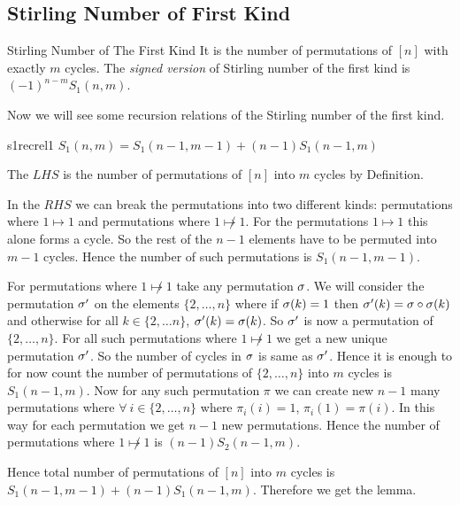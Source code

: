 \subsection{Stirling Number of First Kind}
\begin{Definition}{Stirling Number of The First Kind}{}
It is the number of permutations of $[n]$ with exactly $m$ cycles. The \textit{signed version} of Stirling number of the first kind is $(-1)^{n-m}S_1(n,m)$.
\end{Definition}
Now we will see some recursion relations of the Stirling number of the first kind. 
\begin{lemma}{}{s1recrel1}
	$S_1(n,m)=S_1(n-1,m-1)+(n-1)S_1(n-1,m)$
\end{lemma}
\begin{combi-proof}
	The $LHS$ is the number of permutations of $[n]$ into $m$ cycles by Definition. 
	
	In the $RHS$ we can break the permutations into two different kinds: permutations where $1\mapsto1$ and permutations where $1\not\mapsto 1$. For the permutations $1\mapsto1$ this alone forms a cycle. So the rest of the $n-1$ elements have to be permuted into $m-1$ cycles. Hence the number of such permutations is $S_1(n-1,m-1)$.
	
	For permutations where $1\not\mapsto 1$ take any permutation $\sigma$. We will consider the permutation $\sigma'$ on the elements $\{2,\dots, n\}$ where if $\sigma(k)=1$ then $\sigma'(k)=\sigma\circ\sigma(k)$ and otherwise for all $k\in \{2,\dots n\}$, $\sigma'(k)=\sigma(k)$. So $\sigma'$ is now a permutation of $\{2,\dots, n\}$. For all such permutations where $1\not\mapsto 1$ we get a new unique permutation $\sigma'$. So the number of cycles in $\sigma$ is same as $\sigma'$. Hence it is enough to for now count the number of permutations of $\{2,\dots,n\}$ into $m$ cycles  is $S_1(n-1,m)$. Now for any such permutation $\pi$ we can create new $n-1$ many permutations where $\forall\ i\in\{2,\dots, n\}$ where  $\pi_i(i)=1$, $\pi_i(1)=\pi(i)$. In this way for each permutation we get $n-1$ new permutations. Hence the number of permutations where $1\not\mapsto 1$ is $(n-1)S_2(n-1,m)$. 
	
	Hence total number of permutations of $[n]$ into $m$ cycles is $S_1(n-1,m-1)+(n-1)S_1(n-1,m)$. Therefore we get the lemma. 
\end{combi-proof}

